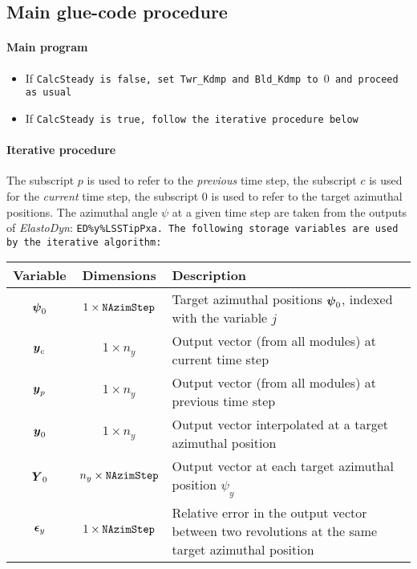\documentclass[11pt]{article}
\begin{document}
\subsection{Main glue-code procedure}
\label{sec:gluecodeiterative}


\paragraph{Main program}
\begin{itemize}\tightlist
    \item If \tt{CalcSteady} is false, set \tt{Twr\_Kdmp} and \tt{Bld\_Kdmp} to $0$ and proceed as usual
    \item If \tt{CalcSteady} is true, follow the iterative procedure below
\end{itemize}


\paragraph{Iterative procedure}
The subscript $p$ is used to refer to the \textit{previous} time step, the subscript $c$ is used for the \textit{current} time step, the subscript $0$ is used to refer to the target azimuthal positions.
% 
The azimuthal angle $\psi$ 
at a given time step are taken from the outputs of \textit{ElastoDyn}: \tt{ED\%y\%LSSTipPxa}.
% 
% 
% 
The following storage variables are used by the iterative algorithm:
\begin{table}[!h]\centering
\begin{tabular}{ccp{10cm}}
\textbf{Variable} & \textbf{Dimensions}& \textbf{Description}\\
\hline
$\v{\psi}_0$ & $1\times \tt{NAzimStep}$ & Target azimuthal positions $\v{\psi}_0$, indexed with the variable $j$ \\
$\v{y}_c$ & $1\times n_y$ & Output vector (from all modules) at current time step \\
$\v{y}_p$ & $1\times n_y$ & Output vector (from all modules) at previous time step \\
$\v{y}_0$ & $1\times n_y$ & Output vector interpolated at a target azimuthal position \\
$\m{Y}_0$ & $n_{y}\times \tt{NAzimStep}$ & Output vector at each target azimuthal position $\psi_y$ \\
$\v{\epsilon}_y$ & $1 \times \tt{NAzimStep}$ & Relative error in the output vector between two revolutions at the same target azimuthal position \\
\hline
\end{tabular}
\end{table}
\end{document}
